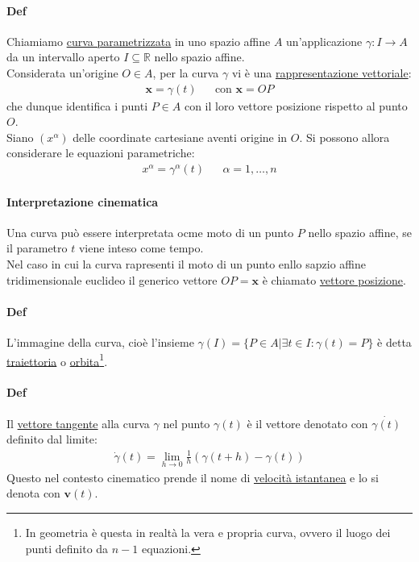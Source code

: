 \documentclass[10pt,a4paper]{book}
\begin{document}
\paragraph{Def} Chiamiamo \underline{curva parametrizzata} in uno spazio affine $A$ un'applicazione $\gamma \colon I \to A$ da un intervallo aperto $I\subseteq \mathbb{R}$ nello spazio affine.\\
Considerata un'origine $O\in A$, per la curva $\gamma$ vi è una \underline{rappresentazione vettoriale}:
\begin{align*}
    \mathbf{x}=\gamma(t)&& \text{con }\mathbf{x}=OP
\end{align*}
che dunque identifica i punti $P\in A$ con il loro vettore posizione rispetto al punto $O$.\\
Siano $(x^\alpha)$ delle coordinate cartesiane aventi origine in $O$. Si possono allora considerare le equazioni parametriche:
\begin{align*}
    x^\alpha= \gamma^\alpha(t) && \alpha=1,\dots, n
\end{align*}
\paragraph{Interpretazione cinematica}Una curva può essere interpretata ocme moto di un punto $P$ nello spazio affine, se il parametro $t$ viene inteso come tempo.\\
Nel caso in cui la curva rapresenti il moto di un punto enllo sapzio affine tridimensionale euclideo il generico vettore $OP=\mathbf{x}$ è chiamato \underline{vettore posizione}.
\paragraph{Def} L'immagine della curva, cioè l'insieme $\gamma(I)=\{P\in A | \exists t \in I: \gamma(t)=P\}$ è detta \underline{traiettoria} o \underline{orbita}\footnote{In geometria è questa in realtà la vera e propria curva, ovvero il luogo dei punti definito da $n-1$ equazioni.}.
\paragraph{Def} Il \underline{vettore tangente} alla curva $\gamma$ nel punto $\gamma(t)$ è il vettore denotato con $\dot{\gamma(t)}$ definito dal limite:
\begin{align*}
    \dot{\gamma}(t)=\lim_{h\to 0}\frac{1}{h}(\gamma(t+h)-\gamma(t))
\end{align*}
Questo nel contesto cinematico prende il nome di \underline{velocità istantanea} e lo si denota con $\mathbf{v}(t)$.
\end{document}
